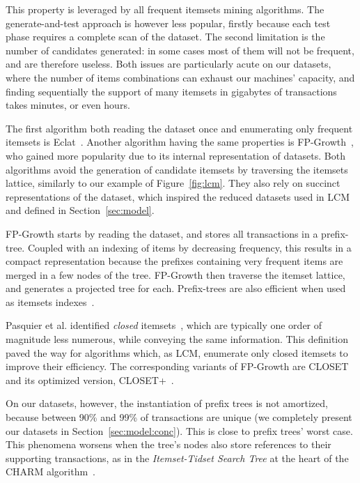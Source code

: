 This property is leveraged by all frequent itemsets mining algorithms.
The generate-and-test approach is however less popular,
firstly because each test phase requires a complete scan of the dataset.
The second limitation is the number of candidates generated:
 in some cases most of them will not be frequent, and are therefore useless.
Both issues are particularly acute on our datasets,
where the number of items combinations can exhaust our machines' capacity,
and finding sequentially the support of many itemsets in gigabytes of transactions takes minutes, or even hours.

The first algorithm both reading the dataset once and enumerating only frequent itemsets is
Eclat~\cite{ZakiKDD97,ZakiTKDE00}.
Another algorithm having the same properties is FP-Growth~\cite{HanSIGMOD00,HanDMKD04},
who gained more popularity due to its internal representation of datasets.
Both algorithms avoid the generation of candidate itemsets by
traversing the itemsets lattice,
similarly to our example of Figure~\ref{fig:lcm}.
They also rely on succinct representations of the dataset,
which inspired the reduced datasets used in LCM and defined in Section~\ref{sec:model}.

FP-Growth starts by reading the dataset,
and stores all transactions in a prefix-tree.
Coupled with an indexing of items by decreasing frequency,
this results in a compact representation
because the prefixes containing very frequent items are merged in a few nodes of the tree.
FP-Growth then traverse the itemset lattice,
and generates a projected tree for each.
Prefix-trees are also efficient when used as itemsets indexes~\cite{LiuVLDB13}.

Pasquier et al. identified {\em closed} itemsets~\cite{PasquierICDT99},
which are typically one order of magnitude less numerous, while conveying the same information.
This definition paved the way for algorithms which, as LCM,
enumerate only closed itemsets to improve their efficiency.
The corresponding variants of FP-Growth are
CLOSET~\cite{PeiSIGMOD00} and its optimized version, CLOSET+~\cite{wangSIGKDD03}.

On our datasets, however, the instantiation of prefix trees is not amortized,
because between 90\% and 99\% of transactions are unique (we completely present our datasets in Section~\ref{sec:model:conc}).
This is close to prefix trees' worst case.
This phenomena worsens when the tree's nodes also store references to their supporting transactions,
as in the {\em Itemset-Tidset Search Tree}
at the heart of the CHARM algorithm~\cite{ZakiTR99,ZakiSDM2002}.


